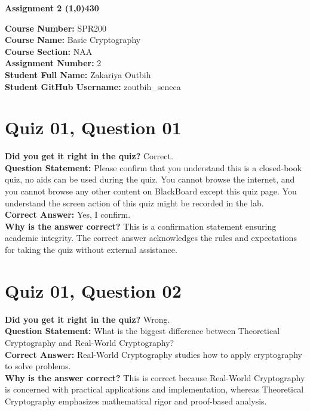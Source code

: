 \documentclass{article}
\begin{document}
\begin{center}
 \LARGE\bfseries Assignment 2 
 \line(1,0){430}
\end{center}

\begin{center}
 \textbf{Course Number:} SPR200 \\
 \textbf{Course Name:} Basic Cryptography \\
 \textbf{Course Section:} NAA \\
 \textbf{Assignment Number:} 2 \\
 \textbf{Student Full Name:} Zakariya Outbih \\
 \textbf{Student GitHub Username:} zoutbih\_seneca
\end{center}

\section*{Quiz 01, Question 01}
\textbf{Did you get it right in the quiz?} Correct. \\
\textbf{Question Statement:} Please confirm that you understand this is a closed-book quiz, no aids can be used during the quiz. You cannot browse the internet, and you cannot browse any other content on BlackBoard except this quiz page. You understand the screen action of this quiz might be recorded in the lab. \\
\textbf{Correct Answer:} Yes, I confirm. \\
\textbf{Why is the answer correct?} This is a confirmation statement ensuring academic integrity. The correct answer acknowledges the rules and expectations for taking the quiz without external assistance.

\section*{Quiz 01, Question 02}
\textbf{Did you get it right in the quiz?} Wrong. \\
\textbf{Question Statement:} What is the biggest difference between Theoretical Cryptography and Real-World Cryptography? \\
\textbf{Correct Answer:} Real-World Cryptography studies how to apply cryptography to solve problems. \\
\textbf{Why is the answer correct?} This is correct because Real-World Cryptography is concerned with practical applications and implementation, whereas Theoretical Cryptography emphasizes mathematical rigor and proof-based analysis.
\end{document}
